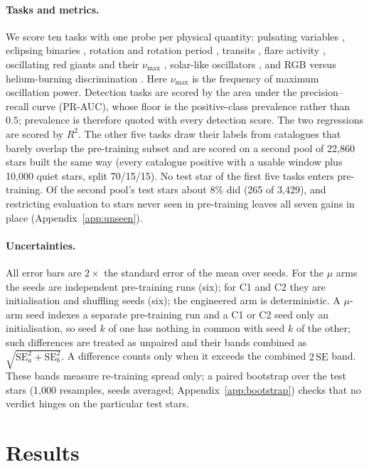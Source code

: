 \documentclass{article}
\begin{document}
\paragraph{Tasks and metrics.} We score ten tasks with one probe per physical quantity: pulsating
variables \citep{gao2025}, eclipsing binaries \citep{prsa2022}, rotation and rotation period
\citep{boyle2026}, transits \citep{guerrero2021}, flare activity \citep{seli2025,vida2021},
oscillating red giants and their $\nu_{\max}$ \citep{hon2021}, solar-like oscillators
\citep{hatt2023}, and RGB versus helium-burning discrimination \citep{sreenivas2026}. Here
$\nu_{\max}$ is the frequency of maximum oscillation power. Detection tasks are scored by the area
under the precision--recall curve (PR-AUC), whose floor is the positive-class prevalence rather than
$0.5$; prevalence is therefore quoted with every detection score. The two regressions are scored by
$R^{2}$. The other five tasks draw their labels from catalogues that barely overlap the pre-training
subset and are scored on a second pool of 22{,}860 stars built the same way (every catalogue positive
with a usable window plus 10{,}000 quiet stars, split 70/15/15). No test star of the first five tasks
enters pre-training. Of the second pool's test stars about 8\% did (265 of 3{,}429), and restricting
evaluation to stars never seen in pre-training leaves all seven gains in place
(Appendix~\ref{app:unseen}).

\paragraph{Uncertainties.} All error bars are $2\times$ the standard error of the mean over seeds.
For the $\mu$ arms the seeds are independent pre-training runs (six); for C1 and C2 they are
initialisation and shuffling seeds (six); the engineered arm is
deterministic. A $\mu$-arm seed indexes a separate pre-training run and a C1 or C2 seed only an
initialisation, so seed $k$ of one has nothing in common with seed $k$ of the other; such differences
are treated as unpaired and their bands combined as $\sqrt{\mathrm{SE}_a^{2}+\mathrm{SE}_b^{2}}$.
A difference counts only when it exceeds the combined $2\,\mathrm{SE}$ band. These bands
measure re-training spread only; a paired bootstrap over the test stars (1{,}000 resamples, seeds
averaged; Appendix~\ref{app:bootstrap}) checks that no verdict hinges on the particular test stars.

\section{Results}
\end{document}
